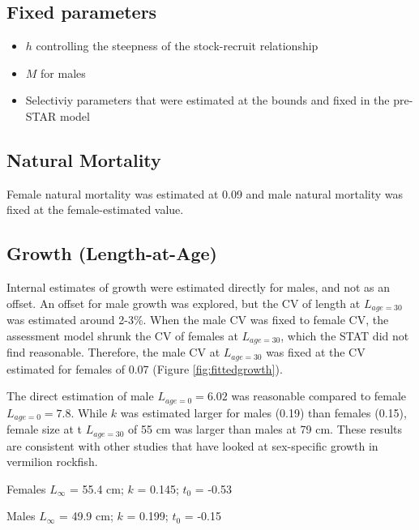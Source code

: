 \documentclass[
  english,
  a4paper,
]{article}
\providecommand{\tightlist}{%
  \setlength{\itemsep}{0pt}\setlength{\parskip}{0pt}}
\begin{document}
\hypertarget{fixed-parameters}{%
\subsection{Fixed parameters}\label{fixed-parameters}}

\begin{itemize}
\tightlist
\item
  \(h\) controlling the steepness of the stock-recruit relationship
\item
  \(M\) for males
\item
  Selectiviy parameters that were estimated at the bounds and fixed in the pre-STAR model
\end{itemize}

\hypertarget{natural-mortality-1}{%
\subsection{Natural Mortality}\label{natural-mortality-1}}

Female natural mortality was estimated at 0.09 and male natural mortality was fixed at the female-estimated value.

\hypertarget{growth-length-at-age}{%
\subsection{Growth (Length-at-Age)}\label{growth-length-at-age}}

Internal estimates of growth were estimated directly for males, and not as an offset. An offset for male growth was explored, but the CV of length at \(L_{age=30}\) was estimated around 2-3\%. When the male CV was fixed to female CV, the assessment model shrunk the CV of females at \(L_{age=30}\), which the STAT did not find reasonable. Therefore, the male CV at \(L_{age=30}\) was fixed at the CV estimated for females of 0.07 (Figure \ref{fig:fittedgrowth}).

The direct estimation of male \(L_{age=0}=6.02\) was reasonable compared to female \(L_{age=0}=7.8\). While \(k\) was estimated larger for males (0.19) than females (0.15), female size at t \(L_{age=30}\) of 55 cm was larger than males at 79 cm. These results are consistent with other studies that have looked at sex-specific growth in vermilion rockfish.

\begin{centering}

Females $L_{\infty}$ = 55.4 cm; $k$ = 0.145; $t_0$ = -0.53

Males $L_{\infty}$ = 49.9 cm; $k$ = 0.199; $t_0$ = -0.15

\end{centering}
\end{document}
